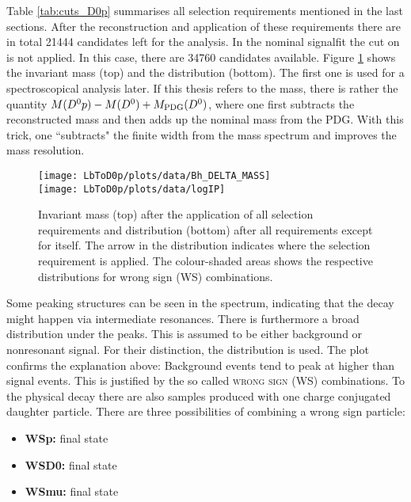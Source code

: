 Table \ref{tab:cuts_D0p} summarises all selection requirements mentioned in the last sections.
After the reconstruction and application of these requirements there are in total 21444 \LbToDpmunuX candidates left for the analysis.
In the nominal signalfit the cut on \logIP is not applied.
In this case, there are 34760 candidates available.
Figure \ref{fig:plot_mD0p_logIP} shows the invariant \Dz\proton mass (top) and the \logIP distribution (bottom). 
The first one is used for a spectroscopical analysis later.
If this thesis refers to the \Dz\proton mass, there is rather the quantity $M({{D}^0}{p}) - M({{D}^0}) + M_\text{PDG}({{D}^0})$, where one first subtracts the reconstructed \Dz mass and then adds up the nominal \Dz mass from the PDG.
With this trick, one ``subtracts" the finite width from the \Dz\proton mass spectrum and improves the mass resolution.
\begin{figure}[hptb]
	\centering
	\texttt{[image: LbToD0p/plots/data/Bh\_DELTA\_MASS]} \\
	\texttt{[image: LbToD0p/plots/data/logIP]}
	\caption{Invariant \Dz\proton mass (top) after the application of all selection requirements and \logIP distribution (bottom) after all requirements except for \logIP itself.
             The arrow in the \logIP distribution indicates where the selection requirement is applied.
             The colour-shaded areas shows the respective distributions for wrong sign (WS) combinations.}
	\label{fig:plot_mD0p_logIP}
\end{figure}
Some peaking structures can be seen in the spectrum, indicating that the decay \LbToDpmunuX might happen via intermediate resonances.
There is furthermore a broad distribution under the peaks.
This is assumed to be either background or nonresonant signal.
For their distinction, the \logIP distribution is used.
The plot confirms the explanation above:
Background events tend to peak at higher \logIP than signal events. 
This is justified by the so called \textsc{wrong sign (WS)} combinations.
To the physical decay \LbToDpmunuX there are also samples produced with one charge conjugated daughter particle.
There are three possibilities of combining a wrong sign particle:
\begin{itemize}
    \item \textbf{WSp:} \Dz\antiproton\mun final state
    \item \textbf{WSD0:} \Dzb\proton\mun final state
    \item \textbf{WSmu:} \Dz\proton\mup final state
\end{itemize}
